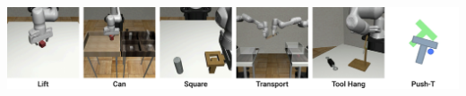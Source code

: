 \documentclass[Afour,sageh,times]{sagej}
\begin{document}
\begin{table}[h]
    
~~~~~~~~~~~~~~~~~~~~~~~~~~~~~~~~~~~~
\includegraphics[width=0.835\linewidth]{figure/sim_task_thumbnails.pdf}
\label{tab:sim_benchmark_state}

\vspace{1mm}
{
\centering


}
\end{table}
\end{document}
